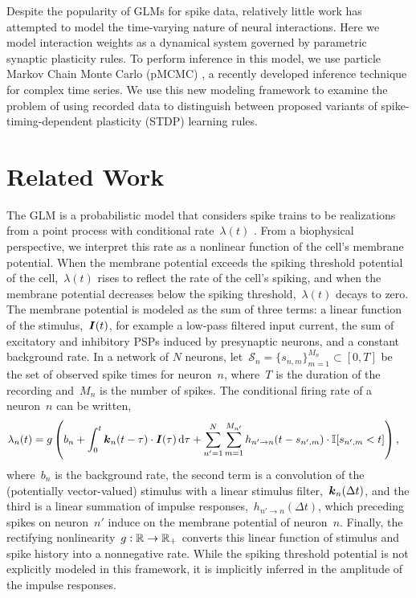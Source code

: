 Despite the popularity of GLMs for spike data, relatively little work has attempted to model the time-varying nature of neural interactions.  Here we model interaction weights as a dynamical system governed by parametric synaptic plasticity rules. To perform inference in this model, we use particle Markov Chain Monte Carlo (pMCMC) \cite{Andrieu-2010}, a recently developed inference technique for complex time series.  We use this new modeling framework to examine the problem of using recorded data to distinguish between proposed variants of spike-timing-dependent plasticity (STDP) learning rules.

\section{Related Work}
The GLM is a probabilistic model that considers spike trains to be realizations from a point process with conditional rate~$\lambda(t)$ \cite{Paninski-2004, Truccolo-2005}. From a biophysical perspective, we interpret this rate as a nonlinear function of the cell's membrane potential. When the membrane potential exceeds the spiking threshold potential of the cell,~$\lambda(t)$ rises to reflect the rate of the cell's spiking, and when the membrane potential decreases below the spiking threshold,~$\lambda(t)$ decays to zero. The membrane potential is modeled as the sum of three terms: a linear function of the stimulus,~${\boldsymbol{I}(t)}$, for example a low-pass filtered input current, the sum of excitatory and inhibitory PSPs induced by presynaptic neurons, and a constant background rate. In a network of $N$ neurons, let~${\mathcal{S}_{n}=\{s_{n,m}\}_{m=1}^{M_n} \subset [0,T]}$ be the set of observed spike times for neuron~$n$, where~$T$ is the duration of the recording and~$M_n$ is the number of spikes. The conditional firing rate of a neuron~$n$ can be written,
\begin{align}
  \lambda_{n}(t) &= g\left(b_n + \int_0^t \boldsymbol{k}_n(t-\tau) \cdot \boldsymbol{I}(\tau)\,\mathrm{d} \tau + \sum_{n'=1}^N\sum_{m=1}^{M_{n'}} h_{n'\to n}(t-s_{n',m}) \cdot \mathbb{I}[s_{n',m} < t] \right),
  \label{eqn:glm_rate}
\end{align}
where~$b_n$ is the background rate, the second term is a convolution of the (potentially vector-valued) stimulus with a linear stimulus filter,~${\boldsymbol{k}_n(\Delta t)}$, and the third is a linear summation of impulse responses,~$h_{n'\to n}(\Delta t)$, which preceding spikes on neuron~$n'$ induce on the membrane potential of neuron~$n$. Finally, the rectifying nonlinearity~${g:\mathbb{R}\to \mathbb{R}_+}$ converts this linear function of stimulus and spike history into a nonnegative rate. While the spiking threshold potential is not explicitly modeled in this framework, it is implicitly inferred in the amplitude of the impulse responses.

